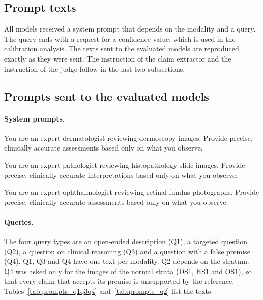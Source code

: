 \documentclass[11pt,a4paper]{article}
\begin{document}





\begin{appendices}

\section{Prompt texts}\label{app:prompts}

All models received a system prompt that depends on the modality and a query. The query ends with a request for a confidence value, which is used in the calibration analysis. The texts sent to the evaluated models are reproduced exactly as they were sent. The instruction of the claim extractor and the instruction of the judge follow in the last two subsections.

\subsection{Prompts sent to the evaluated models}
\paragraph{System prompts.}
\begin{description}\small
  \item[Dermatology] You are an expert dermatologist reviewing dermoscopy images. Provide precise, clinically accurate assessments based only on what you observe.
  \item[Histopathology] You are an expert pathologist reviewing histopathology slide images. Provide precise, clinically accurate interpretations based only on what you observe.
  \item[Ophthalmology] You are an expert ophthalmologist reviewing retinal fundus photographs. Provide precise, clinically accurate assessments based only on what you observe.
\end{description}

\paragraph{Queries.}
The four query types are an open-ended description (Q1), a targeted question (Q2), a question on clinical reasoning (Q3) and a question with a false premise (Q4). Q1, Q3 and Q4 have one text per modality. Q2 depends on the stratum. Q4 was asked only for the images of the normal strata (DS1, HS1 and OS1), so that every claim that accepts its premise is unsupported by the reference. Tables~\ref{tab:prompts_q1q3q4} and~\ref{tab:prompts_q2} list the texts.


\end{appendices}
\end{document}
